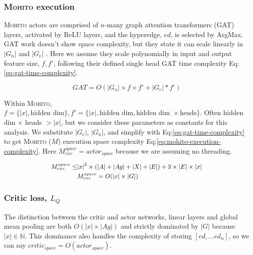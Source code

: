 \documentclass[letterpaper]{article} %
\newcommand{\mohito}{\textsc{Mohito}}
\begin{document}
 \subsubsection{\mohito{} execution}

 \mohito{} actors are comprised of $n$-many graph attention transformers (GAT) \cite{GAT} layers, activated by ReLU layers, and the hyperedge, $ed$, is selected by ArgMax. GAT work doesn't show space complexity, but they state it can scale linearly in $|G_n|$ and $|G_e|$ \cite{GAT}. Here we assume they scale polynomially in input and output feature size, $f,f'$, following their defined single head GAT time complexity Eq:\ref{eq:gat-time-complexity}. 

\begin{equation}
\label{eq:gat-time-complexity}
    GAT= O(|G_n|\times f \times f' + |G_e| * f')
\end{equation}

Within \mohito{}, $f = \{|x|,\text{hidden dim}\}, f'= \{|x|,\text{hidden dim}, \text{hidden dim }\times \text{heads}\}$. Often hidden dim $\times$ heads $> |x|$, but we consider these parameters as constants for this analysis. We substitute $|G_e|$, $|G_n|$, and simplify with Eq:\ref{eq:gat-time-complexity} to get \mohito{} ($M$) execution space complexity Eq:\ref{eq:mohito-execution-complexity}. Here $M^{space}_{exe}=actor_{space}$ because we are assuming no threading.

\begin{equation}
\small
\label{eq:mohito-execution-complexity}
\begin{split}
M_{exe}^{space} \leq& |x|^2 \times (|A| + |Ag| + |X| + |E|) + 3\times|E|\times |x|\\
&M_{exe}^{space}=O(|x| \times |G|)
\end{split}
\end{equation}


\subsubsection{Critic loss, $L_{Q}$}

The distinction between the critic and actor networks, linear layers and global mean pooling are both $O(|x| \times |Ag|)$ and strictly dominated by $|G|$ because $|x|\in \mathbb{N}$. This dominance also handles the complexity of storing $[ed,...ed_n]$, so we can say $critic_{space} = O(actor_{space})$. 
\end{document}
